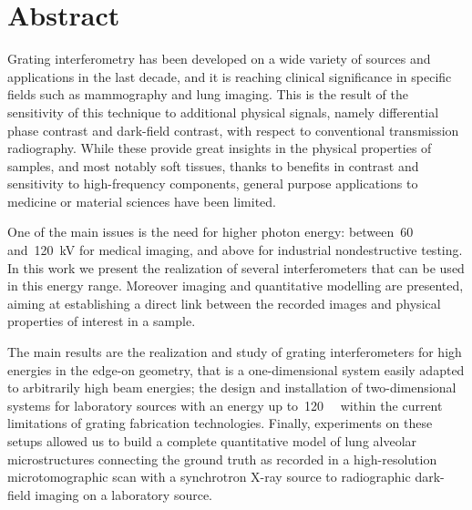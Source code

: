 \begingroup
\let\clearpage\relax
\let\cleardoublepage\relax
\let\cleardoublepage\relax

\chapter*{Abstract}
Grating interferometry has been developed on a wide variety of sources and
applications in the last decade, and it is reaching clinical significance in
specific fields such as mammography and lung imaging. This is the
result of the sensitivity of this technique to additional physical signals,
namely differential phase contrast and dark-field contrast, with respect to
conventional transmission radiography. While these
provide great insights in the physical properties of samples, and most
notably soft tissues, thanks to benefits in contrast and sensitivity to
high-frequency components, general purpose applications to medicine or
material sciences have been limited.

One of the main issues is the need for higher photon energy:
between~\num{60} and~\SI{120}{\kilo\volt} for medical imaging, and above for
industrial nondestructive testing. In this work we present the realization
of several interferometers that can be used in this energy range. Moreover
imaging and quantitative modelling are presented, aiming at establishing a
direct link between the recorded images and physical properties of interest
in a sample.

The main results are the realization and study of grating interferometers for
high energies in the edge-on geometry, that is a one-dimensional system
easily adapted to arbitrarily high beam energies; the design and
installation of
two-dimensional systems for laboratory sources with an energy up
to~\SI{120}{\kilo\voltpeak} within the current limitations of grating
fabrication technologies. Finally, experiments on these setups allowed us
to build a complete quantitative model of lung alveolar
microstructures connecting the ground truth as recorded in a high-resolution
microtomographic scan with a synchrotron X-ray source to radiographic
dark-field imaging on a laboratory source.

\newpage

